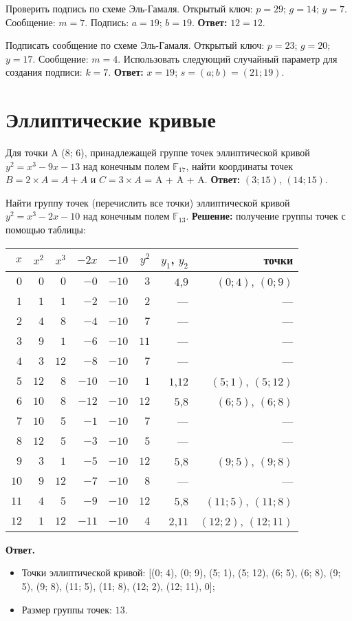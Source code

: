 \tasknumber Проверить подпись по схеме Эль-Гамаля. Открытый ключ: $p = 29$; $g = 14$; $y = 7$. Сообщение: $m = 7$. Подпись: $a = 19$;  $b = 19$.
\medbreak
\textbf{Ответ:} $12 = 12$.
\bigbreak

\tasknumber Подписать сообщение по схеме Эль-Гамаля. Открытый ключ: $p = 23$; $g = 20$; $y = 17$. Сообщение: $m = 4$. Использовать следующий случайный параметр для создания подписи: $k = 7$.
\medbreak
\textbf{Ответ:} $x = 19$; $s = (a; b) = (21; 19)$.
\bigbreak

\section{Эллиптические кривые}
\tasksection

\tasknumber Для точки A (8; 6), принадлежащей группе точек эллиптической кривой $y^2 = x^3 - 9x - 13$ над конечным полем $\mathbb{F}_{17}$, найти координаты точек $B = 2 \times A = A + A$ и $C = 3 \times A$ = A + A + A.
\medbreak
\textbf{Ответ:} $(3; 15)$, $(14; 15)$.
\bigbreak

\tasknumber Найти группу точек (перечислить все точки) эллиптической кривой $y^2 = x^3 - 2 x - 10$ над конечным полем $\mathbb{F}_{13}$.
\medbreak
\textbf{Решение:} получение группы точек с помощью таблицы:\\
\begin{tabular}{|r|r|r|r|r|r|r|r|}
\hline
$x$ & $x^2$ & $x^3$ & $-2x$ & $-10$ & $y^2$ & $y_1$, $y_2$ & точки \\ 
\hline
$0$ & $0$ & $0$ & $-0$ & $-10$ & $3$ & $4$,$9$ &$(0; 4)$, $(0; 9)$ \\
$1$ & $1$ & $1$ & $-2$ & $-10$ & $2$ &  --- & --- \\ 
$2$ & $4$ & $8$ & $-4$ & $-10$ & $7$ &  --- & --- \\ 
$3$ & $9$ & $1$ & $-6$ & $-10$ & $11$ &  --- & --- \\ 
$4$ & $3$ & $12$ & $-8$ & $-10$ & $7$ &  --- & --- \\ 
$5$ & $12$ & $8$ & $-10$ & $-10$ & $1$ & $1$,$12$ &$(5; 1)$, $(5; 12)$ \\ 
$6$ & $10$ & $8$ & $-12$ & $-10$ & $12$ & $5$,$8$ &$(6; 5)$, $(6; 8)$ \\ 
$7$ & $10$ & $5$ & $-1$ & $-10$ & $7$ &  --- & --- \\ 
$8$ & $12$ & $5$ & $-3$ & $-10$ & $5$ &  --- & --- \\ 
$9$ & $3$ & $1$ & $-5$ & $-10$ & $12$ & $5$,$8$ &$(9; 5)$, $(9; 8)$ \\ 
$10$ & $9$ & $12$ & $-7$ & $-10$ & $8$ &  --- & --- \\ 
$11$ & $4$ & $5$ & $-9$ & $-10$ & $12$ & $5$,$8$ &$(11; 5)$, $(11; 8)$ \\ 
$12$ & $1$ & $12$ & $-11$ & $-10$ & $4$ & $2$,$11$ &$(12; 2)$, $(12; 11)$ \\ 
\hline
\end{tabular}
\medbreak
\textbf{Ответ.}
\begin{itemize}
\item Точки эллиптической кривой: [(0; 4), (0; 9), (5; 1), (5; 12), (6; 5), (6; 8), (9; 5), (9; 8), (11; 5), (11; 8), (12; 2), (12; 11), 0];
\item Размер группы точек: $13$.
\end{itemize}
\bigbreak

